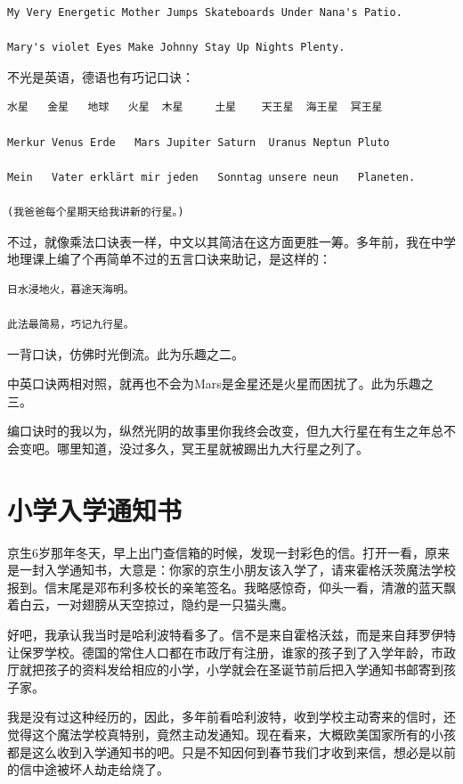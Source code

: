 \documentclass[twoside,openright,headings=optiontohead]{ctexbook} %
\begin{document}
{\begin{verbatim}
My Very Energetic Mother Jumps Skateboards Under Nana's Patio.

Mary's violet Eyes Make Johnny Stay Up Nights Plenty.
\end{verbatim}

不光是英语，德语也有巧记口诀：

\begin{verbatim}
水星   金星   地球   火星  木星     土星    天王星  海王星  冥王星

Merkur Venus Erde   Mars Jupiter Saturn  Uranus Neptun Pluto

Mein   Vater erklärt mir jeden   Sonntag unsere neun   Planeten.

(我爸爸每个星期天给我讲新的行星。)
\end{verbatim}

不过，就像乘法口诀表一样，中文以其简洁在这方面更胜一筹。多年前，我在中学地理课上编了个再简单不过的五言口诀来助记，是这样的：

\begin{verbatim}
日水浸地火，暮途天海明。

此法最简易，巧记九行星。
\end{verbatim}

一背口诀，仿佛时光倒流。此为乐趣之二。

中英口诀两相对照，就再也不会为Mars是金星还是火星而困扰了。此为乐趣之三。

编口诀时的我以为，纵然光阴的故事里你我终会改变，但九大行星在有生之年总不会变吧。哪里知道，没过多久，冥王星就被踢出九大行星之列了。

\chapter*{小学入学通知书}\label{school-info}

京生6岁那年冬天，早上出门查信箱的时候，发现一封彩色的信。打开一看，原来是一封入学通知书，大意是：你家的京生小朋友该入学了，请来霍格沃茨魔法学校报到。信末尾是邓布利多校长的亲笔签名。我略感惊奇，仰头一看，清澈的蓝天飘着白云，一对翅膀从天空掠过，隐约是一只猫头鹰。

好吧，我承认我当时是哈利波特看多了。信不是来自霍格沃兹，而是来自拜罗伊特让保罗学校。德国的常住人口都在市政厅有注册，谁家的孩子到了入学年龄，市政厅就把孩子的资料发给相应的小学，小学就会在圣诞节前后把入学通知书邮寄到孩子家。

我是没有过这种经历的，因此，多年前看哈利波特，收到学校主动寄来的信时，还觉得这个魔法学校真特别，竟然主动发通知。现在看来，大概欧美国家所有的小孩都是这么收到入学通知书的吧。只是不知因何到春节我们才收到来信，想必是以前的信中途被坏人劫走给烧了。

}
\end{document}
